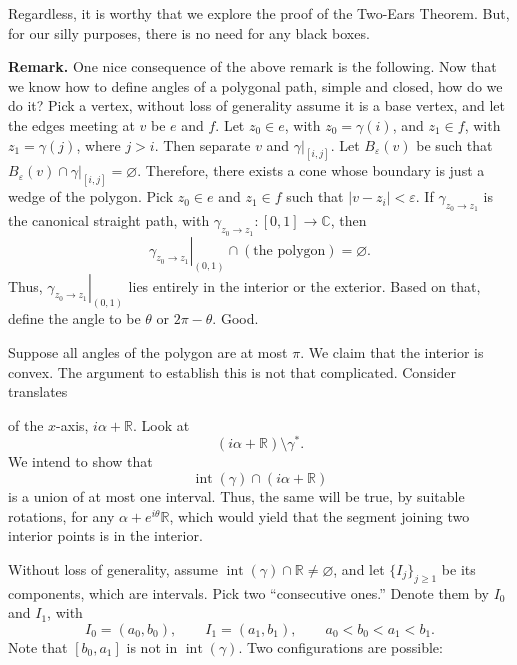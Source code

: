 \documentclass[11pt,a4paper]{article}
\begin{document}
Regardless, it is worthy that we explore the proof of the Two-Ears Theorem. But, for our silly purposes, there is no need for any black boxes.

\textbf{Remark.}
One nice consequence of the above remark is the following. Now that we know how to define angles of a polygonal path, simple and closed, how do we do it? Pick a vertex, without loss of generality assume it is a base vertex, and let the edges meeting at \(v\) be \(e\) and \(f\). Let \(z_0\in e\), with \(z_0=\gamma(i)\), and \(z_1\in f\), with \(z_1=\gamma(j)\), where \(j>i\). Then separate \(v\) and \(\gamma|_{[i,j]}\). Let \(B_\varepsilon(v)\) be such that \(B_\varepsilon(v)\cap\gamma|_{[i,j]}=\varnothing.\)
Therefore, there exists a cone whose boundary is just a wedge of the polygon. Pick \(z_0\in e\) and \(z_1\in f\) such that \(|v-z_i|<\varepsilon\). If \(\gamma_{z_0\to z_1}\) is the canonical straight path, with \(\gamma_{z_0\to z_1}:[0,1]\to\mathbb C\), then
\[
  \left.\gamma_{z_0\to z_1}\right|_{(0,1)}
  \cap(\text{the polygon})=\varnothing.
\]
Thus, \(\left.\gamma_{z_0\to z_1}\right|_{(0,1)}\) lies entirely in the interior or the exterior. Based on that, define the angle to be \(\theta\) or \(2\pi-\theta\). Good.

Suppose all angles of the polygon are at most \(\pi\). We claim that the interior is convex. The argument to establish this is not that complicated. Consider translates


of the \(x\)-axis, \(i\alpha+\mathbb R\). Look at
\[
  (i\alpha+\mathbb R)\setminus\gamma^*.
\]
We intend to show that
\[
  \operatorname{int}(\gamma)\cap(i\alpha+\mathbb R)
\]
is a union of at most one interval. Thus, the same will be true, by suitable rotations, for any \(\alpha+e^{i\theta}\mathbb R\), which would yield that the segment joining two interior points is in the interior.

Without loss of generality, assume \(\operatorname{int}(\gamma)\cap\mathbb R\ne\varnothing\), and let \(\{I_j\}_{j\ge1}\) be its components, which are intervals. Pick two ``consecutive ones.'' Denote them by \(I_0\) and \(I_1\), with
\[
  I_0=(a_0,b_0),
  \qquad
  I_1=(a_1,b_1),
  \qquad a_0<b_0<a_1<b_1.
\]
Note that \([b_0,a_1]\) is not in \(\operatorname{int}(\gamma)\). Two configurations are possible:
\end{document}
